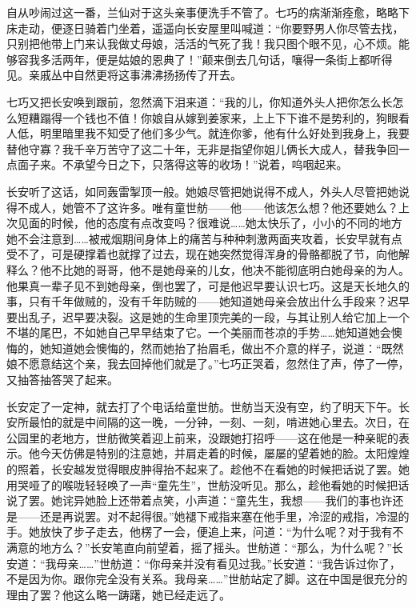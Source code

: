 \par 自从吵闹过这一番，兰仙对于这头亲事便洗手不管了。七巧的病渐渐痊愈，略略下床走动，便逐日骑着门坐着，遥遥向长安屋里叫喊道：“你要野男人你尽管去找，只别把他带上门来认我做丈母娘，活活的气死了我！我只图个眼不见，心不烦。能够容我多活两年，便是姑娘的恩典了！”颠来倒去几句话，嚷得一条街上都听得见。亲戚丛中自然更将这事沸沸扬扬传了开去。
\par 七巧又把长安唤到跟前，忽然滴下泪来道：“我的儿，你知道外头人把你怎么长怎么短糟蹋得一个钱也不值！你娘自从嫁到姜家来，上上下下谁不是势利的，狗眼看人低，明里暗里我不知受了他们多少气。就连你爹，他有什么好处到我身上，我要替他守寡？我千辛万苦守了这二十年，无非是指望你姐儿俩长大成人，替我争回一点面子来。不承望今日之下，只落得这等的收场！”说着，呜咽起来。
\par 长安听了这话，如同轰雷掣顶一般。她娘尽管把她说得不成人，外头人尽管把她说得不成人，她管不了这许多。唯有童世舫——他——他该怎么想？他还要她么？上次见面的时候，他的态度有点改变吗？很难说……她太快乐了，小小的不同的地方她不会注意到……被戒烟期间身体上的痛苦与种种刺激两面夹攻着，长安早就有点受不了，可是硬撑着也就撑了过去，现在她突然觉得浑身的骨骼都脱了节，向他解释么？他不比她的哥哥，他不是她母亲的儿女，他决不能彻底明白她母亲的为人。他果真一辈子见不到她母亲，倒也罢了，可是他迟早要认识七巧。这是天长地久的事，只有千年做贼的，没有千年防贼的——她知道她母亲会放出什么手段来？迟早要出乱子，迟早要决裂。这是她的生命里顶完美的一段，与其让别人给它加上一个不堪的尾巴，不如她自己早早结束了它。一个美丽而苍凉的手势……她知道她会懊悔的，她知道她会懊悔的，然而她抬了抬眉毛，做出不介意的样子，说道：“既然娘不愿意结这个亲，我去回掉他们就是了。”七巧正哭着，忽然住了声，停了一停，又抽答抽答哭了起来。
\par 长安定了一定神，就去打了个电话给童世舫。世舫当天没有空，约了明天下午。长安所最怕的就是中间隔的这一晚，一分钟，一刻、一刻，啃进她心里去。次日，在公园里的老地方，世舫微笑着迎上前来，没跟她打招呼——这在他是一种亲昵的表示。他今天仿佛是特别的注意她，并肩走着的时候，屡屡的望着她的脸。太阳煌煌的照着，长安越发觉得眼皮肿得抬不起来了。趁他不在看她的时候把话说了罢。她用哭哑了的喉咙轻轻唤了一声“童先生”，世舫没听见。那么，趁他看她的时候把话说了罢。她诧异她脸上还带着点笑，小声道：“童先生，我想——我们的事也许还是——还是再说罢。对不起得很。”她褪下戒指来塞在他手里，冷涩的戒指，冷湿的手。她放快了步子走去，他楞了一会，便追上来，问道：“为什么呢？对于我有不满意的地方么？”长安笔直向前望着，摇了摇头。世舫道：“那么，为什么呢？”长安道：“我母亲……”世舫道：“你母亲并没有看见过我。”长安道：“我告诉过你了，不是因为你。跟你完全没有关系。我母亲……”世舫站定了脚。这在中国是很充分的理由了罢？他这么略一踌躇，她已经走远了。
